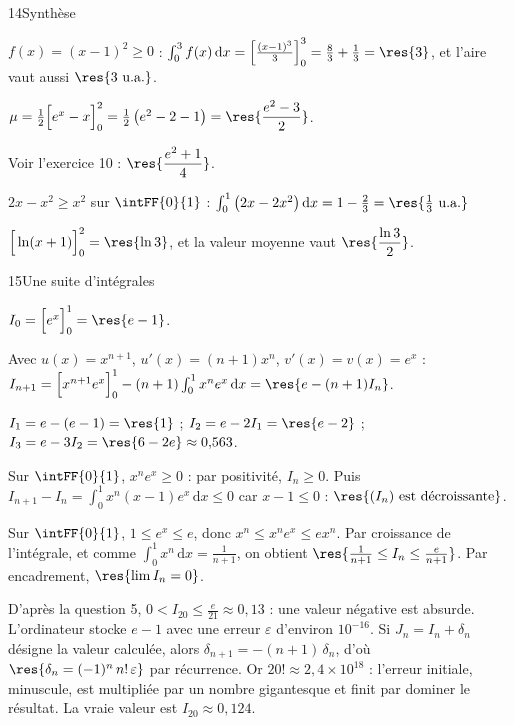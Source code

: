 \begin{corrige}{14}{Synthèse}
\begin{questions}
  \item $f(x)=(x-1)^{2}\geq0$ : $\int_0^3f(x)\,\mathrm{d}x=\left[\frac{(x-1)^{3}}{3}\right]_0^3=\frac83+\frac13=\res{3}$, et l'aire vaut aussi $\res{3\text{ u.a.}}$.
  \item $\mu=\frac12\Big[e^{x}-x\Big]_0^2=\frac12\left(e^{2}-2-1\right)=\res{\dfrac{e^{2}-3}{2}}$.
  \item Voir l'exercice 10 : $\res{\dfrac{e^{2}+1}{4}}$.
  \item $2x-x^{2}\geq x^{2}$ sur $\intFF{0}{1}$ : $\int_0^1\left(2x-2x^{2}\right)\mathrm{d}x=1-\frac23=\res{\frac13\text{ u.a.}}$
  \item $\Big[\ln(x+1)\Big]_0^2=\res{\ln3}$, et la valeur moyenne vaut $\res{\dfrac{\ln3}{2}}$.
\end{questions}
\end{corrige}

\begin{corrige}{15}{Une suite d'intégrales}
\begin{questions}
  \item $I_0=\Big[e^{x}\Big]_0^1=\res{e-1}$.
  \item Avec $u(x)=x^{n+1}$, $u'(x)=(n+1)x^{n}$, $v'(x)=v(x)=e^{x}$ :
    $I_{n+1}=\Big[x^{n+1}e^{x}\Big]_0^1-(n+1)\int_0^1x^{n}e^{x}\,\mathrm{d}x=\res{e-(n+1)I_n}$.
  \item $I_1=e-(e-1)=\res{1}$ ; $I_2=e-2I_1=\res{e-2}$ ; $I_3=e-3I_2=\res{6-2e}\approx0{,}563$.
\end{questions}
\begin{questions}[resume]
  \item Sur $\intFF{0}{1}$, $x^{n}e^{x}\geq0$ : par positivité, $I_n\geq0$. Puis
    $I_{n+1}-I_n=\int_0^1x^{n}(x-1)e^{x}\,\mathrm{d}x\leq0$ car $x-1\leq0$ : $\res{(I_n)\text{ est décroissante}}$.
  \item Sur $\intFF{0}{1}$, $1\leq e^{x}\leq e$, donc $x^{n}\leq x^{n}e^{x}\leq ex^{n}$. Par croissance de l'intégrale, et comme
    $\int_0^1x^{n}\,\mathrm{d}x=\frac{1}{n+1}$, on obtient $\res{\frac{1}{n+1}\leq I_n\leq\frac{e}{n+1}}$. Par encadrement, $\res{\lim I_n=0}$.
\end{questions}
\begin{questions}[resume]
  \item D'après la question 5, $0<I_{20}\leq\frac{e}{21}\approx0{,}13$ : une valeur négative est absurde. L'ordinateur stocke $e-1$ avec
    une erreur $\varepsilon$ d'environ $10^{-16}$. Si $J_n=I_n+\delta_n$ désigne la valeur calculée, alors
    $\delta_{n+1}=-(n+1)\,\delta_n$, d'où $\res{\delta_n=(-1)^{n}\,n!\,\varepsilon}$ par récurrence. Or $20!\approx2{,}4\times10^{18}$ :
    l'erreur initiale, minuscule, est multipliée par un nombre gigantesque et finit par dominer le résultat. La vraie valeur
    est $I_{20}\approx0{,}124$.
\end{questions}
\end{corrige}

